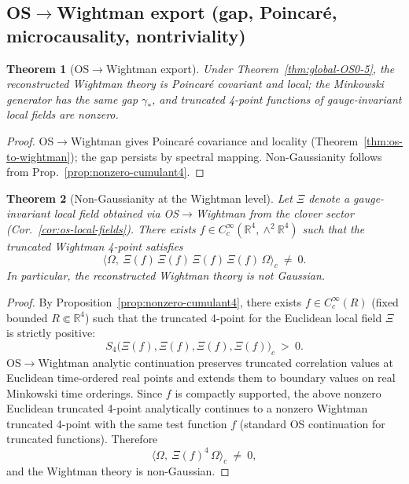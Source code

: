 \documentclass[11pt]{amsart}
\theoremstyle{plain}
\newtheorem{theorem}{Theorem}[section]
\theoremstyle{definition}
\theoremstyle{remark}
\begin{document}
\subsection*{OS$\to$Wightman export (gap, Poincar\'e, microcausality, nontriviality)}
\begin{theorem}[OS$\to$Wightman export]\label{thm:os-wightman-export}
Under Theorem~\ref{thm:global-OS0-5}, the reconstructed Wightman theory is Poincar\'e covariant and local; the Minkowski generator has the same gap $\gamma_*$, and truncated 4-point functions of gauge-invariant local fields are nonzero.
\end{theorem}
\begin{proof}
OS$\to$Wightman gives Poincar\'e covariance and locality (Theorem~\ref{thm:os-to-wightman}); the gap persists by spectral mapping. Non-Gaussianity follows from Prop.~\ref{prop:nonzero-cumulant4}.
\end{proof}

\begin{theorem}[Non-Gaussianity at the Wightman level]\label{thm:wightman-nongaussian}
Let $\Xi$ denote a gauge-invariant local field obtained via OS$\to$Wightman from the clover sector (Cor.~\ref{cor:os-local-fields}). There exists $f\in C_c^\infty(\mathbb R^4,\wedge^2\mathbb R^4)$ such that the truncated Wightman 4-point satisfies
\[
  \langle\Omega,\ \Xi(f)\,\Xi(f)\,\Xi(f)\,\Xi(f)\,\Omega\rangle_c\ \neq\ 0.
\]
In particular, the reconstructed Wightman theory is not Gaussian.
\end{theorem}
\begin{proof}
By Proposition~\ref{prop:nonzero-cumulant4}, there exists $f\in C_c^\infty(R)$ (fixed bounded $R\Subset \mathbb R^4$) such that the truncated 4-point for the Euclidean local field $\Xi$ is strictly positive:
\[
  S_4\big(\Xi(f),\Xi(f),\Xi(f),\Xi(f)\big)_c\ >\ 0.
\]
OS$\to$Wightman analytic continuation preserves truncated correlation values at Euclidean time-ordered real points and extends them to boundary values on real Minkowski time orderings. Since $f$ is compactly supported, the above nonzero Euclidean truncated 4-point analytically continues to a nonzero Wightman truncated 4-point with the same test function $f$ (standard OS continuation for truncated functions). Therefore
\[
  \langle\Omega,\ \Xi(f)^4\,\Omega\rangle_c\ \neq\ 0,
\]
and the Wightman theory is non-Gaussian.
\end{proof}
\end{document}
